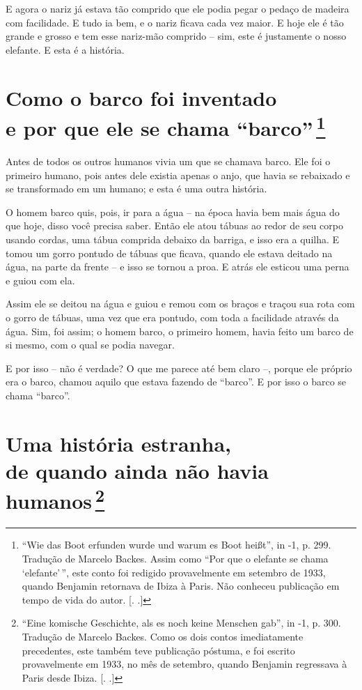 E agora o nariz já estava tão comprido que ele podia pegar o pedaço de
madeira com facilidade. E tudo ia bem, e o nariz ficava cada vez maior.
E hoje ele é tão grande e grosso e tem esse nariz-mão comprido -- sim,
este é justamente o nosso elefante. E esta é a história.

\chapter{Como o barco foi inventado \\e por que ele se chama ``barco''\,\footnote[*]{``Wie
  das Boot erfunden wurde und warum es Boot heißt'', in  -1, p.
  299. Tradução de Marcelo Backes. Assim como ``Por que o elefante se
      chama `elefante'\,'', este conto foi redigido provavelmente em setembro
  de 1933, quando Benjamin retornava de Ibiza à Paris. Não conheceu
  publicação em tempo de vida do autor. [. .]} }

Antes de todos os outros humanos vivia um que se chamava barco. Ele foi
o primeiro humano, pois antes dele existia apenas o anjo, que havia se
rebaixado e se transformado em um humano; e esta é uma outra história.

O homem barco quis, pois, ir para a água -- na época havia bem mais água
do que hoje, disso você precisa saber. Então ele atou tábuas ao redor de
seu corpo usando cordas, uma tábua comprida debaixo da barriga, e isso
era a quilha. E tomou um gorro pontudo de tábuas que ficava, quando ele
estava deitado na água, na parte da frente -- e isso se tornou a proa. E
atrás ele esticou uma perna e guiou com ela.

Assim ele se deitou na água e guiou e remou com os braços e traçou sua
rota com o gorro de tábuas, uma vez que era pontudo, com toda a
facilidade através da água. Sim, foi assim; o homem barco, o primeiro
homem, havia feito um barco de si mesmo, com o qual se podia navegar.

E por isso -- não é verdade? O que me parece até bem claro --, porque
ele próprio era o barco, chamou aquilo que estava fazendo de ``barco''.
E por isso o barco se chama ``barco''.

\chapter{Uma história estranha, \\de quando ainda não havia humanos\,\footnote[*]{``Eine komische Geschichte, als es noch keine
  Menschen gab'', in  -1, p. 300. Tradução de Marcelo Backes. Como
  os dois contos imediatamente precedentes, este também teve publicação
  póstuma, e foi escrito provavelmente em 1933, no mês de setembro,
  quando Benjamin regressava à Paris desde Ibiza. [. .]} }

